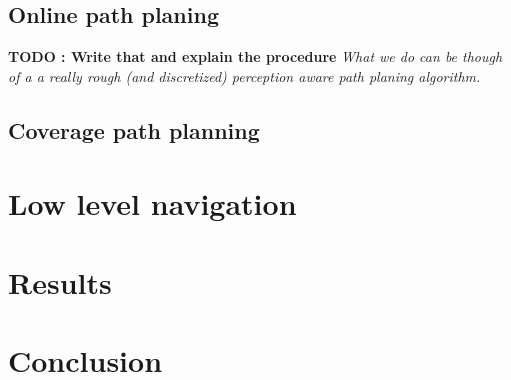 \documentclass[11pt]{article}
\begin{document}
\subsection{Online path planing}

\textbf{TODO : Write that and explain the procedure} \textit{What we do can be though of a a really rough (and discretized) perception aware path planing algorithm.}

\subsection{Coverage path planning}

\cite{epsilon_star} \cite{Galceran13asurvey} \cite{recsplit}

\section{Low level navigation}

\section{Results}

\section{Conclusion}

\tableofcontents

\printbibliography %
\end{document}
